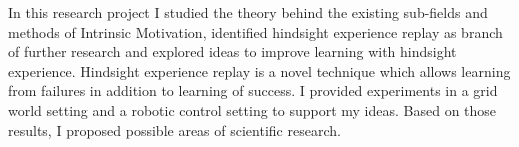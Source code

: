 In this research project I studied the theory behind the existing sub-fields and methods of Intrinsic Motivation, identified hindsight experience replay as branch of further research and explored ideas to improve learning with hindsight experience. Hindsight experience replay is a novel technique which allows learning from failures in addition to learning of success. I provided experiments in a grid world setting and a robotic control setting to support my ideas. Based on those results, I proposed possible areas of scientific research.